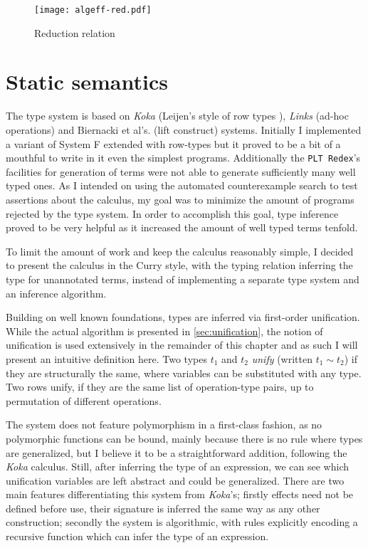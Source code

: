 \documentclass[inz, english, shortabstract]{iithesis}
\newcommand{\Redex}{\texttt{PLT Redex}}
\begin{document}
\begin{figure}
  \centering
  \texttt{[image: algeff-red.pdf]}
  \caption{Reduction relation} 
  \label{fig:algeff-red}
\end{figure} 

\section{Static semantics}
The type system is based on \emph{Koka} \cite{Leijen2014} (Leijen's style of row types \cite{Leijen2005}), \emph{Links} \cite{Hillerstrom2016} (ad-hoc operations) and Biernacki et al's. \cite{Biernacki2017} (lift construct) systems.
Initially I implemented a variant of System F extended with row-types but it proved to be a bit of a mouthful to write in it even the simplest programs.
Additionally the \Redex{}'s facilities for generation of terms were not able to generate sufficiently many well typed ones.
As I intended on using the automated counterexample search to test assertions about the calculus, my goal was to minimize the amount of programs rejected by the type system.
In order to accomplish this goal, type inference proved to be very helpful as it increased the amount of well typed terms tenfold.

To limit the amount of work and keep the calculus reasonably simple, I decided to present the calculus in the Curry style, with the typing relation inferring the type for unannotated terms, instead of implementing a separate type system and an inference algorithm.

Building on well known foundations\cite{Pierce2002}, types are inferred via first-order unification.
While the actual algorithm is presented in \autoref{sec:unification}, the notion of unification is used extensively in the remainder of this chapter and as such I will present an intuitive definition here.
Two types $t_1$ and $t_2$ \emph{unify} (written $t_1 \sim t_2$) if they are structurally the same, where variables can be substituted with any type.
Two rows unify, if they are the same list of operation-type pairs, up to permutation of different operations.

The system does not feature polymorphism in a first-class fashion, as no polymorphic functions can be bound, mainly because there is no rule where types are generalized, but I believe it to be a straightforward addition, following the \emph{Koka} \cite{Leijen2014} calculus.
Still, after inferring the type of an expression, we can see which unification variables are left abstract and could be generalized.
There are two main features differentiating this system from \emph{Koka}'s; firstly effects need not be defined before use, their signature is inferred the same way as any other construction; secondly the system is algorithmic, with rules explicitly encoding a recursive function which can infer the type of an expression.
\end{document}
